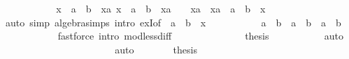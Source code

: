 \begin{isabellebody}
\ \ \ \ \ \ \ \ \isamarkupfalse%
\ \isamarkupfalse%
\ {\isachardoublequoteopen}x\ {\isacharless}{\kern0pt}\ a\ {\isacharplus}{\kern0pt}\ b\ {\isasymLongrightarrow}\ {\isasymexists}xa{\isachardot}{\kern0pt}\ x\ {\isacharequal}{\kern0pt}\ a\ {\isacharplus}{\kern0pt}\ b\ {\isacharminus}{\kern0pt}\ xa\ {\isasymand}\ {}\ {\isacharless}{\kern0pt}\ xa\ {\isasymand}\ xa\ {\isasymle}\ a\ {\isacharplus}{\kern0pt}\ b{\isachardoublequoteclose}\ \ x\isanewline
\ \ \ \ \ \ \ \ \ \ \isamarkupfalse%
\ {\isacharparenleft}{\kern0pt}auto\ simp{\isacharcolon}{\kern0pt}\ algebra{\isacharunderscore}{\kern0pt}simps\ intro{\isacharcolon}{\kern0pt}\ exI{\isacharbrackleft}{\kern0pt}of\ {\isacharunderscore}{\kern0pt}\ {\isachardoublequoteopen}a\ {\isacharplus}{\kern0pt}\ b\ {\isacharminus}{\kern0pt}\ x{\isachardoublequoteclose}{\isacharbrackright}{\kern0pt}{\isacharparenright}{\kern0pt}\isanewline
\ \ \ \ \ \ \ \ \isamarkupfalse%
\ {\isachardoublequoteopen}{\isacharparenleft}{\kern0pt}{\isacharminus}{\kern0pt}{\isacharparenright}{\kern0pt}\ {\isacharparenleft}{\kern0pt}a\ {\isacharplus}{\kern0pt}\ b{\isacharparenright}{\kern0pt}\ {\isacharbackquote}{\kern0pt}\ {\isacharbraceleft}{\kern0pt}{}{\isacharless}{\kern0pt}{\isachardot}{\kern0pt}{\isachardot}{\kern0pt}a\ {\isacharplus}{\kern0pt}\ b{\isacharbraceright}{\kern0pt}\ {\isacharequal}{\kern0pt}\ {\isacharbraceleft}{\kern0pt}{\isachardot}{\kern0pt}{\isachardot}{\kern0pt}{\isacharless}{\kern0pt}a\ {\isacharplus}{\kern0pt}\ b{\isacharbraceright}{\kern0pt}{\isachardoublequoteclose}\ \isanewline
\ \ \ \ \ \ \ \ \ \ \isamarkupfalse%
\ {\isacharparenleft}{\kern0pt}fastforce\ intro{\isacharbang}{\kern0pt}{\isacharcolon}{\kern0pt}\ mod{\isacharunderscore}{\kern0pt}less{\isacharunderscore}{\kern0pt}diff{\isacharparenright}{\kern0pt}\isanewline
\ \ \ \ \ \ \isamarkupfalse%
\isanewline
\ \ \ \ \ \ \isamarkupfalse%
\ {\isacharquery}{\kern0pt}thesis\ \isanewline
\ \ \ \ \ \ \ \ \isamarkupfalse%
\ auto\isanewline
\ \ \ \ \isamarkupfalse%
\isanewline
\ \ \ \ \isamarkupfalse%
\ \isamarkupfalse%
\ {\isachardoublequoteopen}{\isasymdots}\ {\isacharequal}{\kern0pt}\ \ {}{\isachardoublequoteclose}\isanewline
\ \ \ \ \ \ \isamarkupfalse%
\ auto\isanewline
\ \ \ \ \isamarkupfalse%
\ \isamarkupfalse%
\ {\isacharquery}{\kern0pt}thesis\isacommand{{\isachardot}{\kern0pt}}\isamarkupfalse%

\end{isabellebody}
